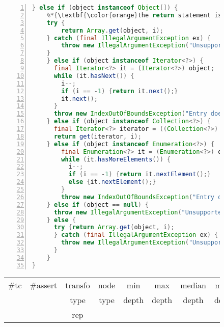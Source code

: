 \begin{figure}[ht]
\begin{lstlisting}[caption={\texttt{get} in commons.collection},label={lst:utils-get},language=java,numbers=left]
  } else if (object instanceof Object[]) {
    %*{\textbf{\color{orange}the return statement is replaced by the following}}*)
    try {
        return Array.get(object, i);
    } catch (final IllegalArgumentException ex) {
        throw new IllegalArgumentException("Unsupported object type: " + object.getClass().getName());
    }
    } else if (object instanceof Iterator<?>) {
      final Iterator<?> it = (Iterator<?>) object;
      while (it.hasNext()) {
        i--;
        if (i == -1) {return it.next();}
        it.next();
      }
      throw new IndexOutOfBoundsException("Entry does not exist: " + i);
    } else if (object instanceof Collection<?>) {
      final Iterator<?> iterator = ((Collection<?>) object).iterator();
      return get(iterator, i);
    } else if (object instanceof Enumeration<?>) {
        final Enumeration<?> it = (Enumeration<?>) object;
        while (it.hasMoreElements()) {
          i--;
          if (i == -1) {return it.nextElement();} 
          else {it.nextElement();}
        }
        throw new IndexOutOfBoundsException("Entry does not exist: " + i);
    } else if (object == null) {
      throw new IllegalArgumentException("Unsupported object type: null");
    } else {
      try {return Array.get(object, i);
      } catch (final IllegalArgumentException ex) {
        throw new IllegalArgumentException("Unsupported object type: " + object.getClass().getName());
      }
    }
}
\end{lstlisting}
\tabcolsep=0.11cm
\begin{tabular}{>{\small}c>{\small}c>{\small}c>{\small}c>{\small}c>{\small}c>{\small}c>{\small}c}
\hline
\rowcolor{lightgray} \#tc & \#assert & transfo & node & min & max & median & mean   \\
\rowcolor{lightgray}  & & type & type & depth  & depth & depth & depth  \\ 
\hline
 &  & rep &  &  &  &  & \\
\hline
\end{tabular}
\end{figure}